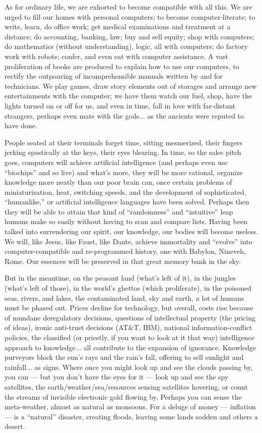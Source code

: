 \documentclass[11pt,twoside,draft]{memoir}
\begin{document}
As for ordinary life, we are exhorted to
become compatible with all this. We are
urged to fill our homes with personal computers;
to become computer-literate; to write,
learn, do office work; get medical examinations 
and treatment at a distance; do accounting, 
banking, law; buy and sell equity;
shop with computers; do mathematics (without
understanding), logic, all with computers; 
do factory work with robots; confer, and
even eat with computer assistance. A vast
proliferation of books are produced to explain
how to use our computers, to rectify
the outpouring of incomprehensible manuals
written by and for technicians. We play
games, draw story elements out of storages
and arrange new entertainments with the
computer; we have them watch our fuel,
shop, have the lights turned on or off for us,
and even in time, fall in love with far-distant
strangers, perhaps even mate with the gods...
as the ancients were reputed to have
done.

People seated at their terminals forget
time, sitting mesmerized, their fingers jerking 
spastically at the keys, their eyes blearing.
In time, so the sales pitch goes, computers 
will achieve artificial intelligence (and
perhaps even use \enquote{biochips} and so live)
and what's more, they will be more rational,
organize knowledge more neatly than our
poor brain can, once certain problems of
miniaturization, heat, switching speeds, and
the development of sophisticated, \enquote{humanlike,} 
or artificial intelligence languages
have been solved. Perhaps then they will be
able to attain that kind of \enquote{randomness} and
\enquote{intuitive} leap humans make so easily without 
having to scan and compare lists. Having
been talked into surrendering our spirit, our
knowledge, our bodies will become useless.
We will, like Jesus, like Faust, like Dante,
achieve immortality and \enquote{evolve} into computer-compatible 
and re-programmed history, one with Babylon, Nineveh, Rome.
Our essences will be preserved in that great
memory bank in the sky.

But in the meantime, on the peasant land
(what's left of it), in the jungles (what's left
of those), in the world's ghettos (which
proliferate), in the poisoned seas, rivers,
and lakes, the contaminated land, sky and
earth, a lot of humans must be phased out.
Prices decline for technology, but overall,
costs rise because of mundane deregulatory
decisions, questions of intellectual property
(the pricing of ideas), ironic anti-trust decisions (AT\&T, IBM), national information-conflict policies, the classified (or priestly, if
you want to look at it that way) intelligence
approach to knowledge... all contribute to
the expansion of ignorance. Knowledge purveyors block the sun's rays and the rain's
fall, offering to sell sunlight and rainfall...
as signs. Where once you might look up and
see the clouds passing by, you can --- but you
don't have the eyes for it --- look up and see
the spy satellites, the earth/weather/sea/resources sensing satellites hovering, or count
the streams of invisible electronic gold flowing by. Perhaps
you can sense the meta-weather, almost as natural as monsoons. For
a deluge of money --- inflation --- is a \enquote{natural} disaster, creating floods, leaving some
lands sodden and others a desert.
\end{document}
